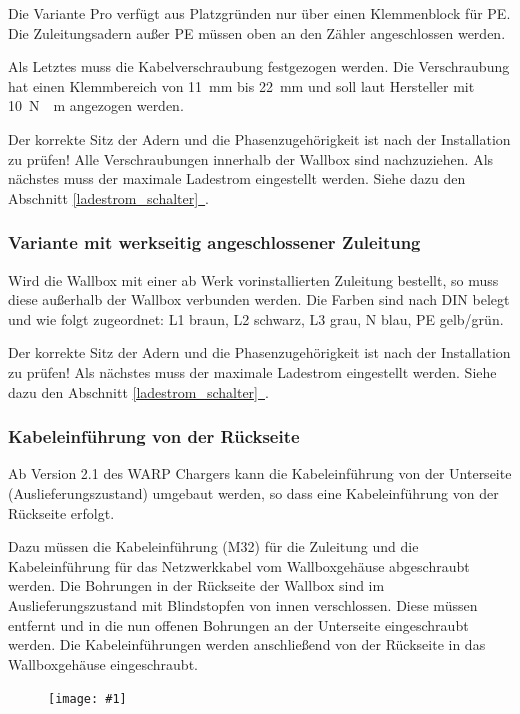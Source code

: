 \documentclass[a4paper,10pt]{article}
\newcommand{\gfx}[1]{\texttt{[image: \#1]}}
\newcommand*{\fullref}[1]{Abschnitt \hyperref[{#1}]{\ref*{#1}~\nameref*{#1}}}
\begin{document}
\begin{multicols*}{2}
    Die Variante Pro verfügt aus Platzgründen nur über einen Klemmenblock für PE. Die
    Zuleitungsadern außer PE müssen oben an den Zähler angeschlossen werden.

    Als Letztes muss die Kabelverschraubung festgezogen werden. Die Verschraubung
    hat einen Klemmbereich von \SI{11}{\milli\meter} bis \SI{22}{\milli\meter} und soll laut Hersteller mit
    \SI{10}{\newton{}\meter} angezogen werden.

    Der korrekte Sitz der Adern und die Phasenzugehörigkeit ist nach der
    Installation zu prüfen! Alle Verschraubungen innerhalb der Wallbox sind
    nachzuziehen. Als nächstes muss der maximale Ladestrom eingestellt werden. Siehe dazu den
	\fullref{ladestrom_schalter}.

    \subsubsection{Variante mit werkseitig angeschlossener Zuleitung}
    Wird die Wallbox mit einer ab Werk vorinstallierten Zuleitung bestellt, so
    muss diese außerhalb der Wallbox verbunden werden. Die Farben sind nach DIN belegt und wie
    folgt zugeordnet: L1 braun, L2 schwarz, L3 grau, N blau, PE gelb/grün.

    Der korrekte Sitz der Adern und die Phasenzugehörigkeit ist nach der
    Installation zu prüfen!
    Als nächstes muss der maximale Ladestrom eingestellt werden. Siehe dazu den
	\fullref{ladestrom_schalter}.

    \subsubsection{Kabeleinführung von der Rückseite}
    Ab Version 2.1 des WARP Chargers kann die Kabel\-einführung von der Unterseite
    (Auslieferungszustand) umgebaut werden, so dass eine Kabeleinführung von der
    Rückseite erfolgt.

    Dazu müssen die Kabeleinführung (M32) für die Zuleitung und die
    Kabeleinführung für das Netzwerkkabel vom Wallboxgehäuse abgeschraubt
    werden. Die Bohrungen in der Rückseite der Wallbox sind im
    Auslieferungszustand mit Blindstopfen von innen verschlossen.
    Diese müssen entfernt und in die nun offenen Bohrungen an der Unterseite
    eingeschraubt werden. Die Kabeleinführungen werden anschließend von
    der Rückseite in das Wallboxgehäuse eingeschraubt.

    \begin{figure}[H]
        \gfx{./img_warp2/resized/warp2_1_back_wp_ready_1000.jpg}
    \end{figure}


\end{multicols*}
\end{document}
